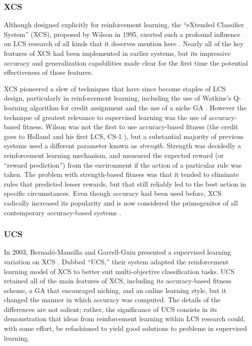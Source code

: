 \documentclass[12pt,twoside]{article}
\begin{document}
\subsubsection{XCS}

Although designed explicitly for reinforcement learning, the ``eXtended Classifier System'' (XCS), proposed by Wilson in 1995, exerted such a profound influence on LCS research of all kinds that it deserves mention here \cite{wilson_classifier_1995}. Nearly all of the key features of XCS had been implemented in earlier systems, but its impressive accuracy and generalization capabilities made clear for the first time the potential effectiveness of those features.

XCS pioneered a slew of techniques that have since become staples of LCS design, particularly in reinforcement learning, including the use of Watkins's Q-learning algorithm for credit assignment and the use of a niche GA \cite{urbanowicz_learning_2009}. However the technique of greatest relevance to supervised learning was the use of accuracy-based fitness. Wilson was not the first to use accuracy-based fitness (the credit goes to Holland and his first LCS, CS-1 \cite{holland_cognitive_1977}), but a substantial majority of previous systems used a different parameter known as \emph{strength}. Strength was decidedly a reinforcement learning mechanism, and measured the expected reward (or ``reward prediction'') from the environment if the action of a particular rule was taken. The problem with strength-based fitness was that it tended to eliminate rules that predicted lesser rewards, but that still reliably led to the best action in specific circumstances. Even though accuracy had been used before, XCS radically increased its popularity and is now considered the primogenitor of all contemporary accuracy-based systems \cite{urbanowicz_learning_2009}.

\subsubsection{UCS}

In 2003, Bernad\'o-Mansilla and Garrell-Guiu presented a supervised learning variation on XCS \cite{bernado-mansilla_accuracy-based_2003}. Dubbed ``UCS,'' their system adapted the reinforcement learning model of XCS to better suit multi-objective classification tasks. UCS retained all of the main features of XCS, including its accuracy-based fitness scheme, a GA that encouraged niching, and an online learning style, but it changed the manner in which accuracy was computed. The details of the differences are not salient; rather, the significance of UCS consists in its demonstration that ideas from reinforcement learning within LCS research could, with some effort, be refashioned to yield good solutions to problems in supervised learning.
\end{document}
